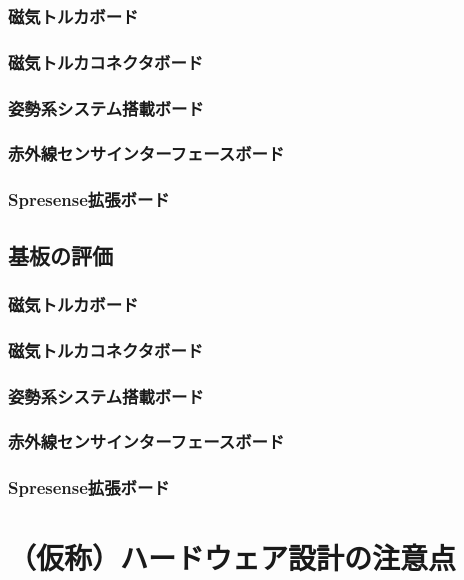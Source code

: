 \subsubsection{磁気トルカボード}
\subsubsection{磁気トルカコネクタボード}
\subsubsection{姿勢系システム搭載ボード}
\subsubsection{赤外線センサインターフェースボード}
\subsubsection{Spresense拡張ボード}

\subsection{基板の評価}
\subsubsection{磁気トルカボード}
\subsubsection{磁気トルカコネクタボード}
\subsubsection{姿勢系システム搭載ボード}
\subsubsection{赤外線センサインターフェースボード}
\subsubsection{Spresense拡張ボード}

\section{（仮称）ハードウェア設計の注意点}



